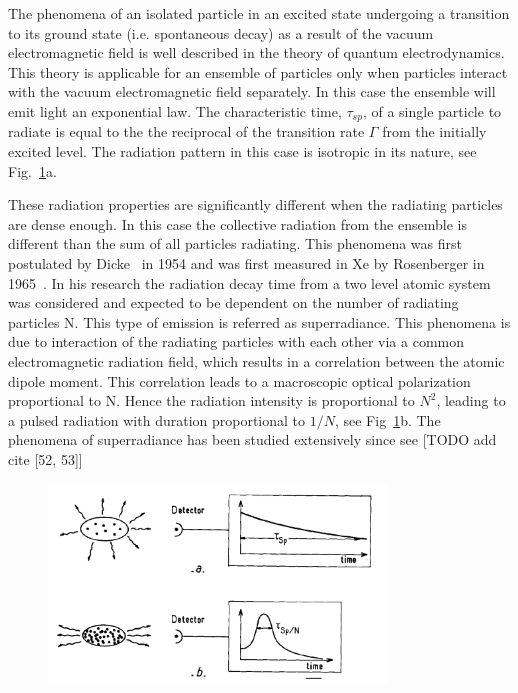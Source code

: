 The phenomena of an isolated particle in an excited state undergoing a transition to its ground state (i.e. spontaneous decay) as a result of the vacuum electromagnetic field  is well described in the theory of quantum electrodynamics. This theory is applicable for an ensemble of particles only when particles interact with the vacuum electromagnetic field separately. In this case the ensemble will emit light an exponential law. The characteristic time, $\tau_{sp}$, of a single particle to radiate is equal to the the reciprocal of the transition rate $\Gamma$ from the initially excited level. The radiation pattern in this case is isotropic in its nature, see Fig.~\ref{fig:emissionType}a. 

These radiation properties are significantly different when the radiating particles are dense enough. In this case the collective radiation from  the ensemble is different than the sum of all particles radiating. This phenomena was first postulated by Dicke~\cite{DickeSR} in 1954 and was first measured in Xe by Rosenberger in 1965~\cite{FirstMeasure}. In his research the radiation decay time from a two level atomic system was considered and expected to be dependent on the number of radiating particles N. This type of emission is referred as superradiance. This phenomena is due to interaction of the radiating particles with each other via a common electromagnetic radiation field, which results in a correlation between the atomic dipole moment. This correlation leads to a macroscopic optical polarization proportional to N. Hence the radiation intensity is proportional to $N^2$, leading to a pulsed radiation with duration proportional to $1/N$, see Fig~\ref{fig:emissionType}b. The phenomena of superradiance has been studied extensively since see [TODO add cite [52, 53]]   
\begin{figure}[t!]
	\centering
	\includegraphics[width=0.8\textwidth]{figs/emissionTypes.png}
	\label{fig:emissionType}
\end{figure}


